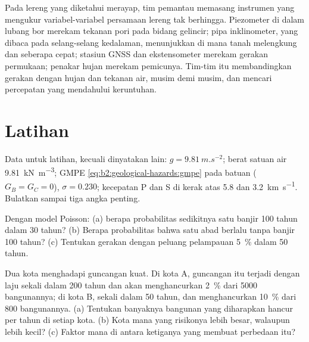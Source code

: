 \begin{inthefield}
Pada lereng yang diketahui merayap, tim pemantau memasang instrumen yang mengukur variabel-variabel
persamaan lereng tak berhingga. Piezometer di dalam lubang bor merekam tekanan pori pada bidang gelincir;
pipa inklinometer, yang dibaca pada selang-selang kedalaman, menunjukkan di mana tanah melengkung dan seberapa cepat; stasiun
GNSS dan ekstensometer merekam gerakan permukaan; penakar hujan merekam pemicunya.
Tim-tim itu membandingkan gerakan dengan hujan dan tekanan air, musim demi musim, dan mencari
percepatan yang mendahului keruntuhan.
\end{inthefield}

\section*{Latihan}\label{sec:b2:geological-hazards:exercises}

Data untuk latihan, kecuali dinyatakan lain: $g = \qty{9.81}{m.s^{-2}}$; berat satuan air
\qty{9.81}{kN.m^{-3}}; GMPE \eqref{eq:b2:geological-hazards:gmpe} pada batuan ($G_B = G_C = 0$),
$\sigma = 0.230$; kecepatan P dan S di kerak atas 5.8 dan \qty{3.2}{km.s^{-1}}. Bulatkan sampai tiga
angka penting.

\begin{exercise}[$\star$]\label{exo:b2:geological-hazards:1}
Dengan model Poisson: (a) berapa probabilitas sedikitnya satu banjir 100 tahun dalam 30 tahun?
(b) Berapa probabilitas bahwa satu abad berlalu tanpa banjir 100 tahun? (c) Tentukan  gerakan dengan peluang pelampauan \qty{5}{\percent} dalam 50 tahun.
\end{exercise}

\begin{exercise}[$\star$]\label{exo:b2:geological-hazards:2}
Dua kota menghadapi guncangan kuat. Di kota A, guncangan itu terjadi dengan laju sekali dalam 200 tahun dan akan
menghancurkan \qty{2}{\percent} dari 5000 bangunannya; di kota B, sekali dalam 50 tahun, dan menghancurkan
\qty{10}{\percent} dari 800 bangunannya. (a) Tentukan banyaknya bangunan yang diharapkan hancur per
tahun di setiap kota. (b) Kota mana yang risikonya lebih besar, walaupun  lebih kecil? (c)
Faktor mana di antara ketiganya yang membuat perbedaan itu?
\end{exercise}

